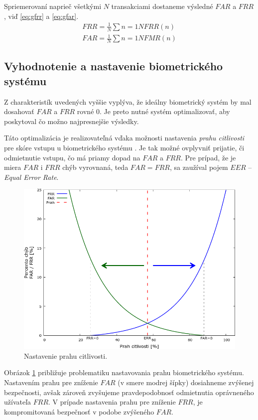 Spriemerovaní naprieč všetkými $N$ transakciami dostaneme výsledné $FAR$ a $FRR$, viď \ref{eq:gfrr} a \ref{eq:gfar}.
\begin{align}
FRR = \frac{1}{N}\sum{n=1}{N} FRR(n) \label{eq:gfrr} \\
FAR = \frac{1}{N}\sum{n=1}{N} FMR(n) \label{eq:gfar}
\end{align}

\subsection{Vyhodnotenie a nastavenie biometrického systému}
Z charakteristík uvedených vyššie vyplýva, že ideálny biometrický systém by mal dosahovať $FAR$ a $FRR$ rovné 0. Je preto nutné systém optimalizovať, aby poskytoval čo možno najpresnejšie výsledky. 

Táto optimalizácia je realizovateľná vďaka možnosti nastavenia \emph{prahu citlivosti} pre skóre vstupu u biometrického systému \cite{bio3}. Je tak možné ovplyvniť prijatie, či odmietnutie vstupu, čo má priamy dopad na $FAR$ a $FRR$. Pre prípad, že je miera $FAR$ i $FRR$ chýb vyrovnaná, teda $FAR = FRR$, sa zaužíval pojem $EER$ -- \emph{Equal Error Rate}.

\begin{figure}[!ht]
	\centering
	\includegraphics[width=13cm]{img/prah.png}
	\caption{Nastavenie prahu citlivosti\cite{bio3}.}
	\label{fig:prah}
\end{figure}

Obrázok \ref{fig:prah} približuje problematiku nastavovania prahu biometrického systému. Nastavením prahu pre zníženie $FAR$ (v smere modrej šípky) dosiahneme zvýšenej bezpečnosti, avšak zároveň zvyšujeme pravdepodobnosť odmietnutia oprávneného užívateľa $FRR$. V prípade nastavenia prahu pre zníženie $FRR$, je kompromitovaná bezpečnosť v podobe zvýšeného $FAR$.

